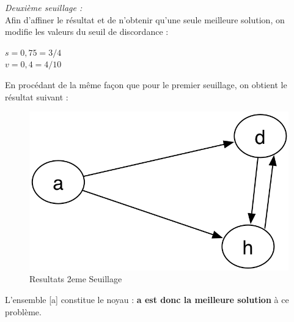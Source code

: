 \documentclass[a4paper, 11pt]{article}
\begin{document}
\emph{Deuxième seuillage :}\\
Afin d’affiner le résultat et de n’obtenir qu’une seule meilleure solution, on modifie les valeurs du seuil de discordance :\\
\begin{center}
\textbf{$s = 0,75 = 3/4$\\
$v= 0,4 = 4/10$}
\end{center}
En procédant de la même façon que pour le premier seuillage, on obtient le résultat suivant :\\
\begin{figure}[H]
   \begin{center}
        \includegraphics[scale=0.30]{../CR/src/Mimi/1er.png}
        \caption{
           \label{fig} Resultats 2eme Seuillage
        }
    \end{center}
\end{figure}
L’ensemble [a] constitue le noyau : \textbf{a est donc la meilleure solution} à ce problème.\\
\end{document}

